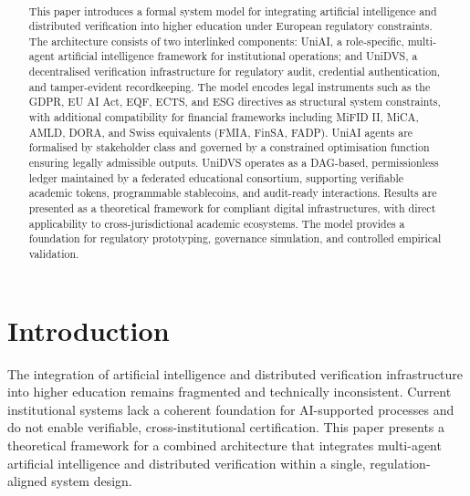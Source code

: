 \documentclass[oneside,10pt]{swissi}
\title{\papertitle \\[0.35em]
\normalsize \papersubtitle}
\author{{\fontsize{8}{10}\selectfont\paperauthors}\\[0.9em]
{\scriptsize\paperaffiliations}}
\date{\vspace{1.5em}}
\begin{document}
\maketitle

\begin{abstract}
This paper introduces a formal system model for integrating artificial intelligence and distributed verification into higher education under European regulatory constraints. The architecture consists of two interlinked components: UniAI, a role-specific, multi-agent artificial intelligence framework for institutional operations; and UniDVS, a decentralised verification infrastructure for regulatory audit, credential authentication, and tamper-evident recordkeeping. The model encodes legal instruments such as the GDPR, EU AI Act, EQF, ECTS, and ESG directives as structural system constraints, with additional compatibility for financial frameworks including MiFID II, MiCA, AMLD, DORA, and Swiss equivalents (FMIA, FinSA, FADP). UniAI agents are formalised by stakeholder class and governed by a constrained optimisation function ensuring legally admissible outputs. UniDVS operates as a DAG-based, permissionless ledger maintained by a federated educational consortium, supporting verifiable academic tokens, programmable stablecoins, and audit-ready interactions. Results are presented as a theoretical framework for compliant digital infrastructures, with direct applicability to cross-jurisdictional academic ecosystems. The model provides a foundation for regulatory prototyping, governance simulation, and controlled empirical validation.
\end{abstract}


\bigskip

\section{Introduction}

The integration of artificial intelligence and distributed verification infrastructure into higher education remains fragmented and technically inconsistent. Current institutional systems lack a coherent foundation for AI-supported processes and do not enable verifiable, cross-institutional certification. This paper presents a theoretical framework for a combined architecture that integrates multi-agent artificial intelligence and distributed verification within a single, regulation-aligned system design.
\end{document}
